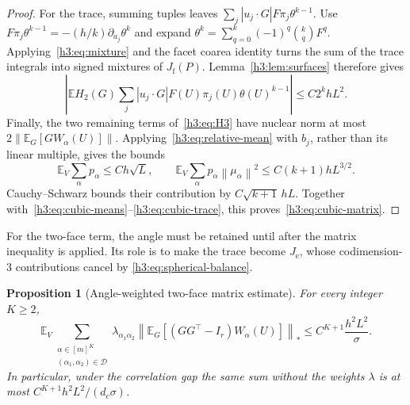 \documentclass[11pt,letterpaper]{article}
\newtheorem{proposition}{Proposition}
\theoremstyle{remark}
\newcommand{\E}{\mathbb E}
\newcommand{\cD}{\mathcal D}
\newcommand{\norm}[1]{\left\lVert#1\right\rVert}
\begin{document}
\begin{proof}
For the trace, summing tuples leaves
$\sum_j|u_j\cdot G|F\pi_j\theta^{k-1}$.
Use
$F\pi_j\theta^{k-1}=-(h/k)\partial_{a_j}\theta^k$ and expand
$\theta^k=\sum_{q=0}^k(-1)^q\binom{k}{q}F^q$.
Applying~\eqref{h3:eq:mixture} and the facet coarea identity turns the
sum of the trace integrals into signed mixtures of $J_{\mathrm f}(P)$.
Lemma~\ref{h3:lem:surfaces} therefore gives
\begin{equation}
 \left|\E H_2(G)\sum_j|u_j\cdot G|F(U)\pi_j(U)\theta(U)^{k-1}\right|
 \le C2^khL^2.
 \label{h3:eq:cubic-trace}
\end{equation}
Finally, the two remaining terms of~\eqref{h3:eq:H3} have nuclear norm
at most $2\norm{\E_G[G W_\alpha(U)]}$.
Applying~\eqref{h3:eq:relative-mean} with $b_j$, rather than its linear
multiple, gives the bounds
\[
 \E_V\sum_\alpha p_\alpha\le Ch\sqrt L,\qquad
 \E_V\sum_\alpha p_\alpha\norm{\mu_\alpha}^2
 \le C(k+1)hL^{3/2}.
\]
Cauchy--Schwarz bounds their contribution by $C\sqrt{k+1}\,hL$.
Together with~\eqref{h3:eq:cubic-means}--\eqref{h3:eq:cubic-trace}, this
proves~\eqref{h3:eq:cubic-matrix}.
\end{proof}

For the two-face term, the angle must be retained until after the
matrix inequality is applied. Its role is to make the trace become
$J_{\mathrm e}$, whose codimension-$3$ contributions cancel by
\eqref{h3:eq:spherical-balance}.

\begin{proposition}[Angle-weighted two-face matrix estimate]\label{h3:prop:pair}
For every integer $K\ge2$,
\begin{equation}
 \E_V\sum_{\substack{\alpha\in[m]^K\\(\alpha_1,\alpha_2)\in\cD}}
 \lambda_{\alpha_1\alpha_2}
 \left\|\E_G[(GG^\top-I_r)W_\alpha(U)]\right\|_*
 \le C^{K+1}\frac{h^2L^2}{\sigma}.
 \label{h3:eq:weighted-pair-matrix}
\end{equation}
In particular, under the correlation gap the same sum without the
weights $\lambda$ is at most $C^{K+1}h^2L^2/(d_c\sigma)$.
\end{proposition}
\end{document}
